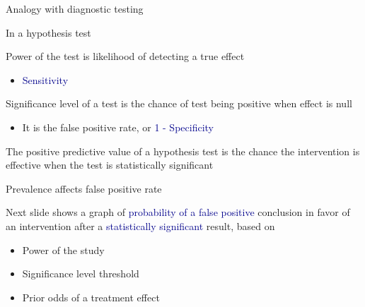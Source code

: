 \documentclass[ignorenonframetext,]{beamer}
\providecommand{\tightlist}{%
  \setlength{\itemsep}{0pt}\setlength{\parskip}{0pt}}
\begin{document}
\begin{frame}{Analogy with diagnostic testing}
\protect\hypertarget{analogy-with-diagnostic-testing}{}

In a hypothesis test

Power of the test is likelihood of detecting a true effect

\begin{itemize}
\tightlist
\item
  \textcolor{darkblue}{Sensitivity}
\end{itemize}

Significance level of a test is the chance of test being positive when
effect is null

\begin{itemize}
\tightlist
\item
  It is the false positive rate, or
  \textcolor{darkblue}{1 - Specificity}
\end{itemize}

The positive predictive value of a hypothesis test is the chance the
intervention is effective when the test is statistically significant

\end{frame}

\begin{frame}{Prevalence affects false positive rate}
\protect\hypertarget{prevalence-affects-false-positive-rate}{}

Next slide shows a graph of
\textcolor{darkblue}{probability of a false positive} conclusion in
favor of an intervention after a
\textcolor{darkblue}{statistically significant} result, based on

\begin{itemize}
\item
  Power of the study
\item
  Significance level threshold
\item
  \textcolor{forest}{Prior odds of a treatment effect}
\end{itemize}

\end{frame}
\end{document}
